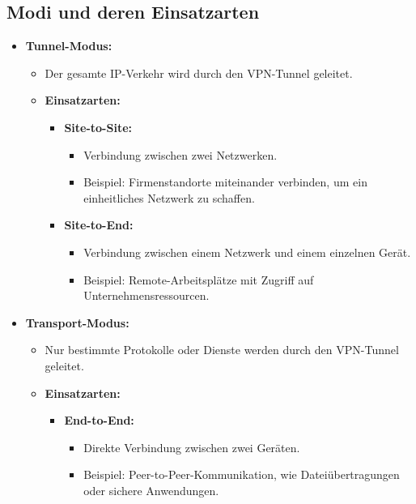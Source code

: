 \subsection{Modi und deren Einsatzarten}
\begin{itemize}
    \item \textbf{Tunnel-Modus:}
    \begin{itemize}
        \item Der gesamte IP-Verkehr wird durch den VPN-Tunnel geleitet.
        \item \textbf{Einsatzarten:}
        \begin{itemize}
            \item \textbf{Site-to-Site:} 
            \begin{itemize}
                \item Verbindung zwischen zwei Netzwerken.
                \item Beispiel: Firmenstandorte miteinander verbinden, um ein einheitliches Netzwerk zu schaffen.
            \end{itemize}
            \item \textbf{Site-to-End:}
            \begin{itemize}
                \item Verbindung zwischen einem Netzwerk und einem einzelnen Gerät.
                \item Beispiel: Remote-Arbeitsplätze mit Zugriff auf Unternehmensressourcen.
            \end{itemize}
        \end{itemize}
    \end{itemize}
    \item \textbf{Transport-Modus:}
    \begin{itemize}
        \item Nur bestimmte Protokolle oder Dienste werden durch den VPN-Tunnel geleitet.
        \item \textbf{Einsatzarten:}
        \begin{itemize}
            \item \textbf{End-to-End:}
            \begin{itemize}
                \item Direkte Verbindung zwischen zwei Geräten.
                \item Beispiel: Peer-to-Peer-Kommunikation, wie Dateiübertragungen oder sichere Anwendungen.
            \end{itemize}
        \end{itemize}
    \end{itemize}
\end{itemize}

